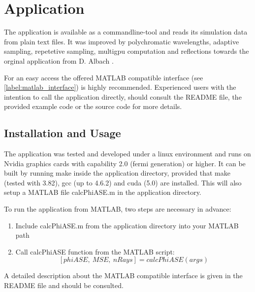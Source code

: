 \section{Application}

The application is available as a commandline-tool and reads
its simulation data from plain text files. It was improved by polychromatic
wavelengths, adaptive sampling, repetetive sampling, multigpu computation and 
reflections towards the orginal application from D. Albach \cite{ASE2010}.

For an easy access the offered MATLAB compatible interface (see \ref{label:matlab_interface}) 
is highly recommended. Experienced users with the intention to call the application
directly, should consult the README file, the provided 
example code or the source code for more details.

\subsection{Installation and Usage}
The application was tested and developed under a linux environment
and runs on Nvidia graphics cards with capability 2.0 (fermi generation) or higher.
It can be built by running make inside the application directory, provided
that make (tested with 3.82), gcc (up to 4.6.2) and cuda (5.0) are installed. 
This will also setup a MATLAB file calcPhiASE.m in the application
directory. 

To run the application from MATLAB, two steps are
necessary in advance:
\begin{enumerate}
  \label{label:matlab_interface}
  \item Include calcPhiASE.m from the application directory into your MATLAB path
  \item Call calcPhiASE function from the MATLAB script: \[[phiASE,~MSE,~nRays] = calcPhiASE(args)\]
\end{enumerate}
A detailed description about the MATLAB compatible interface
is given in the README file and should be consulted.




